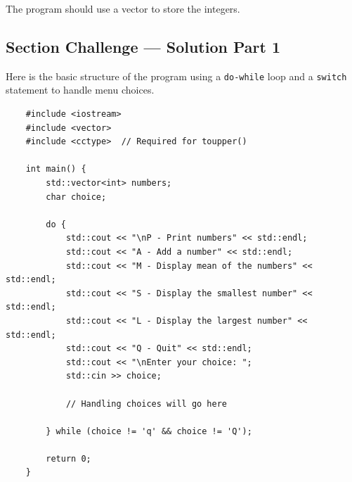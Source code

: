 The program should use a vector to store the integers.

\subsection{Section Challenge --- Solution Part 1}
Here is the basic structure of the program using a \texttt{do-while} loop and a \texttt{switch} statement to handle menu choices.
\begin{lstlisting}
	#include <iostream>
	#include <vector>
	#include <cctype>  // Required for toupper()

	int main() {
		std::vector<int> numbers;
		char choice;

		do {
			std::cout << "\nP - Print numbers" << std::endl;
			std::cout << "A - Add a number" << std::endl;
			std::cout << "M - Display mean of the numbers" << std::endl;
			std::cout << "S - Display the smallest number" << std::endl;
			std::cout << "L - Display the largest number" << std::endl;
			std::cout << "Q - Quit" << std::endl;
			std::cout << "\nEnter your choice: ";
			std::cin >> choice;

			// Handling choices will go here

		} while (choice != 'q' && choice != 'Q');

		return 0;
	}
\end{lstlisting}

